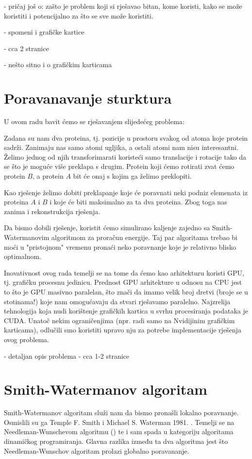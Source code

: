 \documentclass[times, utf8, zavrsni]{fer}
\begin{document}
- pričaj još o: zašto je problem koji si rješavao bitan,
kome koristi, kako se može koristiti i potencijalno za što se
sve može koristiti.

- spomeni i grafičke kartice

- cca 2 stranice

- nešto sitno i o grafičkim karticama

\chapter{Poravanavanje sturktura}
U ovom radu bavit ćemo se rješavanjem slijedećeg problema: 

Zadana su nam dva proteina, tj. pozicije u prostoru svakog od atoma
koje protein sadrži. Zanimaju nas samo atomi ugljika, a ostali atomi
nam nisu interesantni. Želimo jednog od njih transforimarati 
koristeći samo translacije i rotacije tako da se što je moguće više
preklapa s drugim. Protein koji ćemo rotirati zvat ćemo protein $B$,
a protein $A$ bit će onaj s kojim ga želimo preklopiti. 

Kao rješenje želimo dobiti preklapanje koje će poravnati
neki podniz elemenata iz proteina $A$ i $B$ i koje će biti maksimalno
za ta dva proteina. Zbog toga nas zanima i rekonstrukcija rješenja. 

Da bismo dobili rješenje, koristit ćemo simulirano kaljenje 
zajedno sa Smith-Watermanovim algoritmom za proračun energije. 
Taj par algoritama trebao bi moći u "pristojnom" vremenu pronaći
neko poravnanje koje je relativno blisko optimalnom. 

Inovativnost ovog rada temelji se na tome da ćemo kao arhitekturu
koristi GPU, tj. grafičku procesnu jedinicu. Prednost GPU arhitekture
u odnosu na CPU jest to što je GPU masivno paralelan, što znači
da imamo velik broj dretvi (broje se u stotinama!) koje nam omogućavaju
da stvari rješavamo paralelno. Najzrelija tehnologija koja nudi
korištenje grafičkih kartica u svrhu procesiranja podataka je CUDA.
Unatoč nekim ograničenjima (npr. radi samo na Nvidijinim grafičkim
karticama), odlučili smo koristiti upravo nju za potrebe implementacije
rješenja ovog problema. 

- detaljan opis problema
- cca 1-2 stranice

\chapter{Smith-Watermanov algoritam}
Smith-Watermanov algoritam služi nam da bismo pronašli lokalno poravnanje. 
Osmislili su ga Temple F. Smith i Michael S. Waterman 1981. \cite{smithwaterman1981}.
Temelji se na Needleman-Wunschevom algoritmu (\cite{needlemanwunsch1970})
te i sam spada u kategoriju algoritama dinamičkog programiranja. Glavna razlika
između ta dva algoritma jest što Needleman-Wunschov algoritam prolazi globalno
poravananje.
\end{document}
